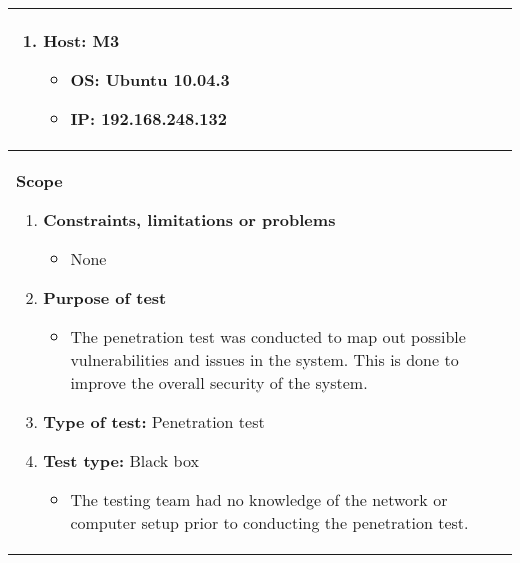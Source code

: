 \begin{longtable}{|p{16.5cm}|}
\begin{enumerate}
	\item \textbf{Host:} M3
		\begin{itemize}
			\item OS: Ubuntu 10.04.3
			\item IP: 192.168.248.132
		\end{itemize}
\end{enumerate}
\\ \hline
\textbf{Scope }
\begin{enumerate}
	\item \textbf{Constraints, limitations or problems}
		\begin{itemize}
			\item None
		\end{itemize}
	\item \textbf{Purpose of test}
		\begin{itemize}
			\item The penetration test was conducted to map out possible vulnerabilities and issues in the system. This is done to improve the overall security of the system.
		\end{itemize}
	\item \textbf{Type of test:}  Penetration test
	\item \textbf{Test type:} Black box
		\begin{itemize}
			\item The testing team had no knowledge of the network or computer setup prior to conducting the penetration test. 
		\end{itemize}
\end{enumerate}
\\ \hline
\end{longtable} 